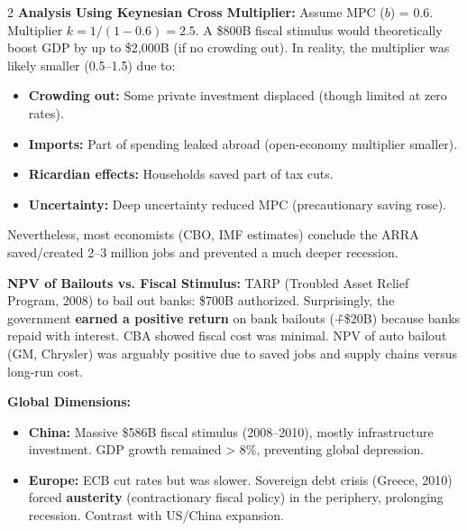 \documentclass[10pt,a4paper]{article}
\begin{document}
\begin{multicols}{2}
\textbf{Analysis Using Keynesian Cross Multiplier:}
Assume MPC ($b$) = 0.6. Multiplier $k = 1/(1-0.6) = 2.5$. A \$800B fiscal stimulus would theoretically boost GDP by up to \$2,000B (if no crowding out). In reality, the multiplier was likely smaller (0.5--1.5) due to:
\begin{itemize}[nosep]
    \item \textbf{Crowding out:} Some private investment displaced (though limited at zero rates).
    \item \textbf{Imports:} Part of spending leaked abroad (open-economy multiplier smaller).
    \item \textbf{Ricardian effects:} Households saved part of tax cuts.
    \item \textbf{Uncertainty:} Deep uncertainty reduced MPC (precautionary saving rose).
\end{itemize}
Nevertheless, most economists (CBO, IMF estimates) conclude the ARRA saved/created 2--3 million jobs and prevented a much deeper recession.

\textbf{NPV of Bailouts vs. Fiscal Stimulus:}
TARP (Troubled Asset Relief Program, 2008) to bail out banks: \$700B authorized. Surprisingly, the government \textbf{earned a positive return} on bank bailouts (\~ +{\$}20B) because banks repaid with interest. CBA showed fiscal cost was minimal. NPV of auto bailout (GM, Chrysler) was arguably positive due to saved jobs and supply chains versus long-run cost.

\textbf{Global Dimensions:}
\begin{itemize}[leftmargin=*,nosep]
    \item \textbf{China:} Massive \$586B fiscal stimulus (2008--2010), mostly infrastructure investment. GDP growth remained > 8\%, preventing global depression.
    \item \textbf{Europe:} ECB cut rates but was slower. Sovereign debt crisis (Greece, 2010) forced \textbf{austerity} (contractionary fiscal policy) in the periphery, prolonging recession. Contrast with US/China expansion.
\end{itemize}


\end{multicols}
\end{document}
